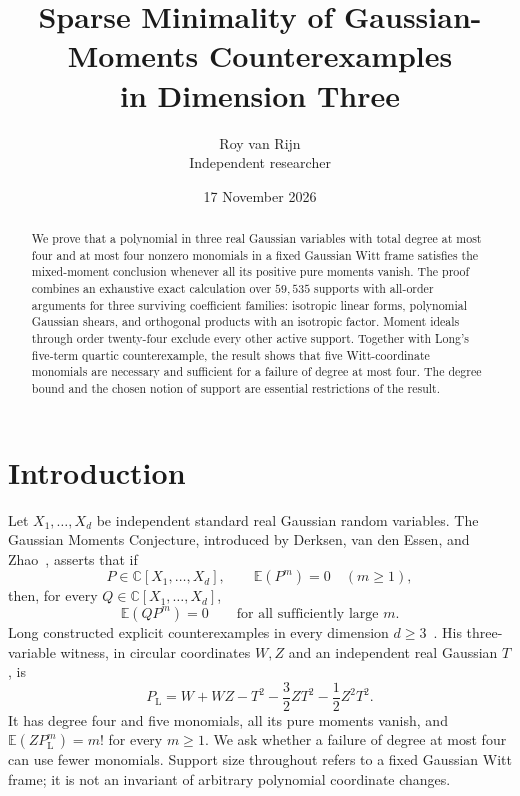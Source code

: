 \documentclass[11pt]{article}
\title{Sparse Minimality of Gaussian-Moments Counterexamples\\
in Dimension Three}
\author{Roy van Rijn\\{\small Independent researcher}}
\date{17 November 2026}
\newcommand{\C}{\mathbb C}
\newcommand{\E}{\mathbb E}
\begin{document}
\maketitle

\begin{abstract}
We prove that a polynomial in three real Gaussian variables with total
degree at most four and at most four nonzero monomials in a fixed Gaussian
Witt frame satisfies the mixed-moment conclusion whenever all its positive
pure moments vanish.  The proof combines an exhaustive exact calculation
over \(59{,}535\) supports with all-order arguments for three surviving
coefficient families: isotropic linear forms, polynomial Gaussian shears,
and orthogonal products with an isotropic factor.  Moment ideals through
order twenty-four exclude every other active support.  Together with
Long's five-term quartic counterexample, the result shows that five
Witt-coordinate monomials are necessary and sufficient for a failure of
degree at most four.  The degree bound and the chosen notion of support
are essential restrictions of the result.
\end{abstract}

\section{Introduction}

Let \(X_1,\ldots,X_d\) be independent standard real Gaussian random
variables.  The Gaussian Moments Conjecture, introduced by Derksen, van den
Essen, and Zhao~\cite{DVZ}, asserts that if
\[
  P\in\C[X_1,\ldots,X_d],
  \qquad \E(P^m)=0\quad(m\geq1),
\]
then, for every \(Q\in\C[X_1,\ldots,X_d]\),
\[
  \E(QP^m)=0
  \qquad\text{for all sufficiently large }m.
\]
Long constructed explicit counterexamples in every dimension
\(d\geq3\)~\cite[Theorem~5.1 and Corollary~5.2]{Long}.  His three-variable witness, in circular
coordinates \(W,Z\) and an independent real Gaussian \(T\), is
\begin{equation}\label{eq:long}
 P_{\mathrm L}
 =W+WZ-T^2-\frac32ZT^2-\frac12Z^2T^2.
\end{equation}
It has degree four and five monomials, all its pure moments vanish, and
\(\E(ZP_{\mathrm L}^m)=m!\) for every \(m\geq1\).  We ask whether a failure of degree at most four can use fewer monomials.
Support size throughout refers to a fixed Gaussian Witt frame; it is not
an invariant of arbitrary polynomial coordinate changes.
\end{document}
